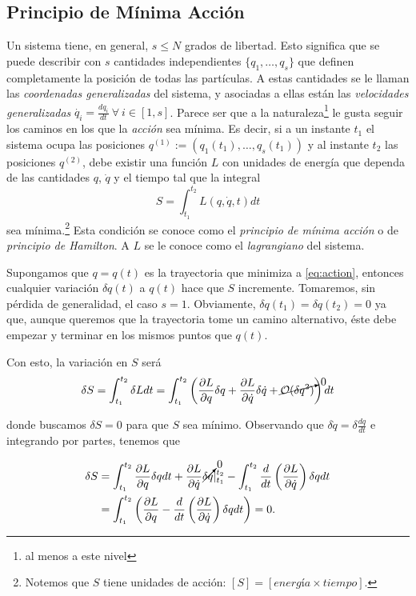 \subsection{Principio de Mínima Acción}
\label{sec:least_action}

Un sistema tiene, en general, $s \leq N$ grados de libertad. Esto significa que se puede describir con $s$ cantidades independientes $\lbrace q_1, \ldots, q_s \rbrace$ que definen completamente la posición de todas las partículas. A estas cantidades se le llaman las \textit{coordenadas generalizadas} del sistema, y asociadas a ellas están las \textit{velocidades generalizadas} $\dot{q_i} = \frac{dq_i}{dt} \  \forall \ i \in [1,s]$. Parece ser que a la naturaleza\footnote{al menos a este nivel} le gusta seguir los caminos en los que la \textit{acción} sea mínima. Es decir, si a un instante $t_1$ el sistema ocupa las posiciones $q^{(1)} := (q_1(t_1), \ldots, q_s(t_1))$ y al instante $t_2$ las posiciones $q^{(2)}$,  debe existir una función $L$ con unidades de energía que dependa de las cantidades $q$, $\dot{q}$ y el tiempo tal que la integral 
\begin{equation}
 S = \int_{t_1}^{t_2} L(q,\dot{q},t) dt
 \label{eq:action}
\end{equation}
sea mínima.\footnote{Notemos que $S$ tiene unidades de acción: $[ S ] = [energía \times tiempo]$.} Esta condición se conoce como el \textit{principio de mínima acción} o de \textit{principio de Hamilton}. A $L$ se le conoce como el \textit{lagrangiano} del sistema.

Supongamos que $q = q(t)$ es la trayectoria que minimiza a \ref{eq:action}, entonces cualquier variación $\delta q(t)$ a $q(t)$ hace que $S$ incremente. Tomaremos, sin pérdida de generalidad, el caso $s = 1$. Obviamente, $\delta q(t_1) = \delta q(t_2) = 0$ ya que, aunque queremos que la trayectoria tome un camino alternativo, éste debe empezar y terminar en los mismos puntos que $q(t)$. 

Con esto, la variación en $S$ será 
\begin{align*}
 \delta S = \int_{t_1}^{t_2} \delta L dt = \int_{t_1}^{t_2} \left( \frac{\partial L}{\partial q} \delta q + \frac{\partial L}{\partial  \dot{q} } \delta \dot{q} + \cancelto{0}{\mathcal{O}(\delta q^2)} \right) dt
\end{align*}

donde buscamos $\delta S = 0$ para que $S$ sea mínimo. Observando que $\delta \dot{q} = \delta \frac{dq}{dt}$ e integrando por partes, tenemos que 

\begin{align*}
 \delta S &= \int_{t_1}^{t_2} \frac{\partial L}{\partial q} \delta q dt + \frac{\partial L}{\partial \dot{q}} \cancelto{0}{\delta q} \rvert_{t_1}^{t_2} - \int_{t_1}^{t_2} \frac{d}{dt} \left( \frac{\partial L}{\partial \dot{q}} \right) \delta q dt\\ 
 &= \int_{t_1}^{t_2} \left( \frac{\partial L}{\partial q} - \frac{d}{dt} \left( \frac{\partial L}{\partial  \dot{q} } \right) \delta q dt \right) = 0.
\end{align*}

